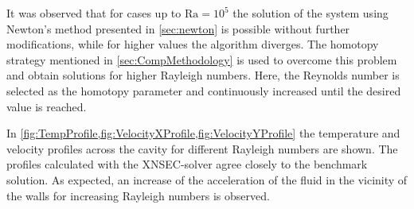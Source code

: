 It was observed that for cases up to $\text{Ra} = 10^5$ the solution of the system using Newton's method presented in \cref{sec:newton} is possible without further modifications, while for higher values the algorithm diverges. The homotopy strategy mentioned in \cref{sec:CompMethodology} is used to overcome this problem and obtain solutions for higher Rayleigh numbers. Here, the Reynolds number is selected as the homotopy parameter and continuously increased until the desired value is reached.

In \cref{fig:TempProfile,fig:VelocityXProfile,fig:VelocityYProfile} the temperature and velocity profiles across the cavity for different Rayleigh numbers are shown. The profiles calculated with the XNSEC-solver agree closely to the benchmark solution. As expected, an increase of the acceleration of the fluid in the vicinity of the walls for increasing Rayleigh numbers is observed.

